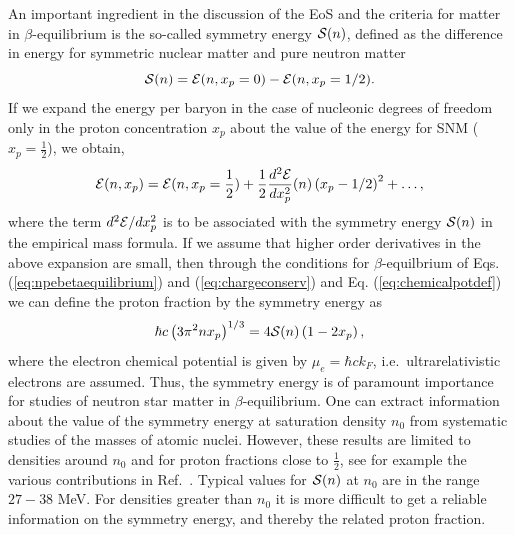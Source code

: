 An important ingredient in the discussion of the EoS and the criteria for
matter in $\beta$-equilibrium is the so-called symmetry energy ${\cal S} (n)$, 
defined as
the difference in energy for symmetric nuclear matter
and pure neutron matter 
\begin{equation}
      {\cal S} (n) = {\cal E} (n,x_p=0) - {\cal E} (n,x_p=1/2 ).
      \label{eq:symenergy}
\end{equation}
If we expand the energy per baryon in the case of nucleonic degrees of freedom 
only
in the proton concentration $x_p$ about the value of the energy 
for SNM ($x_p=\frac{1}{2}$), we obtain,
\begin{equation}
     {\cal E} (n,x_p)={\cal E} (n,x_p=\frac{1}{2})+
     \frac{1}{2}\frac{d^2 {\cal E}}{dx_p^2} (n)\left(x_p-1/2\right)^2+\dots ,
     \label{eq:energyexpansion}
\end{equation}
where the term $d^2 {\cal E}/dx_p^2$ 
is to be associated with the symmetry energy ${\cal S} (n)$ in the empirical
mass formula. If
we assume that higher order derivatives in the above expansion are small, then through the 
conditions
for $\beta$-equilbrium of Eqs. (\ref{eq:npebetaequilibrium}) and 
(\ref{eq:chargeconserv})
and Eq. (\ref{eq:chemicalpotdef}) we can define the proton
fraction by the symmetry energy as
\begin{equation}  
    \hbar c\left(3\pi^2nx_p\right)^{1/3} = 4{\cal S} (n)\left(1-2x_p\right),
    \label{eq:crudeprotonfraction}
\end{equation}
where the electron chemical potential is given
by $\mu_e = \hbar c k_F$, i.e.\  ultrarelativistic electrons are assumed.
Thus, the symmetry energy is of paramount importance for studies 
of neutron star matter in $\beta$-equilibrium.
One can extract information about the value of the symmetry energy at saturation 
density
$n_0$ from systematic studies of the masses of atomic nuclei. However, these 
results
are limited to densities around $n_0$ and for proton fractions close to 
$\frac{1}{2}$, see for example the various contributions in Ref.~\cite{symmetryenergy2013}.
Typical values for ${\cal S} (n)$ at $n_0$ are in the range $27-38$ MeV.
For densities greater than $n_0$ it is more difficult to get a reliable 
information on the symmetry energy, and thereby the related proton fraction.

